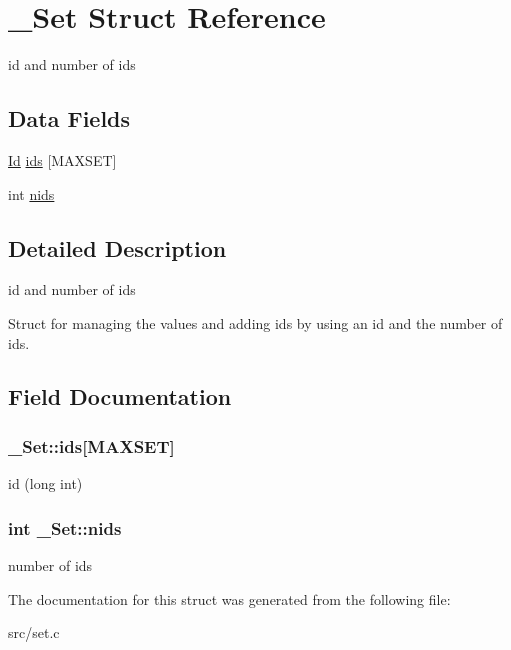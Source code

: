 \hypertarget{struct__Set}{}\section{\+\_\+\+Set Struct Reference}
\label{struct__Set}


id and number of ids  


\subsection*{Data Fields}
\begin{DoxyCompactItemize}
\item 
\hyperlink{types_8h_a845e604fb28f7e3d97549da3448149d3}{Id} \hyperlink{struct__Set_a1b17ea0ae355f78db02768ad4e6fd85d}{ids} \mbox{[}M\+A\+X\+S\+ET\mbox{]}
\item 
int \hyperlink{struct__Set_a9bdd7b9ab8cf4d6568c4eea567f8e56a}{nids}
\end{DoxyCompactItemize}


\subsection{Detailed Description}
id and number of ids 

Struct for managing the values and adding ids by using an id and the number of ids. 

\subsection{Field Documentation}
\subsubsection[{\texorpdfstring{ids}{ids}}]{ \+\_\+\+Set\+::ids\mbox{[}M\+A\+X\+S\+ET\mbox{]}}\hypertarget{struct__Set_a1b17ea0ae355f78db02768ad4e6fd85d}{}\label{struct__Set_a1b17ea0ae355f78db02768ad4e6fd85d}
id (long int) 
\subsubsection[{\texorpdfstring{nids}{nids}}]{\setlength{\rightskip}{0pt plus 5cm}int \+\_\+\+Set\+::nids}\hypertarget{struct__Set_a9bdd7b9ab8cf4d6568c4eea567f8e56a}{}\label{struct__Set_a9bdd7b9ab8cf4d6568c4eea567f8e56a}
number of ids 

The documentation for this struct was generated from the following file\+:\begin{DoxyCompactItemize}
\item 
src/set.\+c\end{DoxyCompactItemize}
